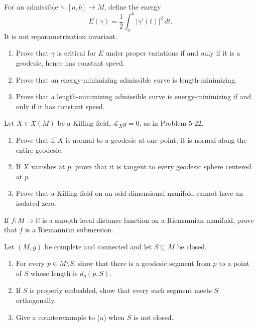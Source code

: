 \begin{exercise}
\label{prob:energy-functional}

For an admissible $\gamma:[a,b]\to M$, define the energy
\[
E(\gamma)=\frac12\int_a^b|\gamma'(t)|^2\,dt.
\]
It is not reparametrization invariant.
\begin{enumerate}
\item[(a)] Prove that $\gamma$ is critical for $E$ under proper variations if
and only if it is a geodesic, hence has constant speed.
\item[(b)] Prove that an energy-minimizing admissible curve is
length-minimizing.
\item[(c)] Prove that a length-minimizing admissible curve is energy-minimizing
if and only if it has constant speed.
\end{enumerate}
\end{exercise}

\begin{exercise}
\label{prob:killing-vector-field-properties}

Let $X\in\mathfrak X(M)$ be a Killing field, $\mathcal L_Xg=0$, as in
Problem 5-22.
\begin{enumerate}
\item[(a)] Prove that if $X$ is normal to a geodesic at one point, it is normal
along the entire geodesic.
\item[(b)] If $X$ vanishes at $p$, prove that it is tangent to every geodesic
sphere centered at $p$.
\item[(c)] Prove that a Killing field on an odd-dimensional manifold cannot
have an isolated zero.
\end{enumerate}
\end{exercise}

\begin{exercise}
\label{prob:distance-function-submersion}

If $f:M\to\mathbb R$ is a smooth local distance function on a Riemannian
manifold, prove that $f$ is a Riemannian submersion.
\end{exercise}

\begin{exercise}
\label{prob:geodesic-to-closed-subset}

Let $(M,g)$ be complete and connected and let $S\subseteq M$ be closed.
\begin{enumerate}
\item[(a)] For every $p\in M\setminus S$, show that there is a geodesic
segment from $p$ to a point of $S$ whose length is $d_g(p,S)$.
\item[(b)] If $S$ is properly embedded, show that every such segment meets $S$
orthogonally.
\item[(c)] Give a counterexample to (a) when $S$ is not closed.
\end{enumerate}
\end{exercise}

